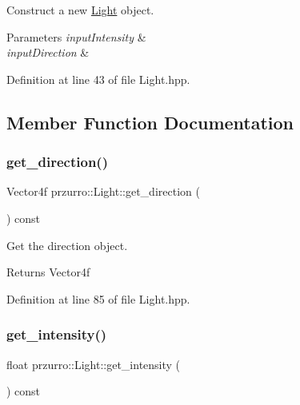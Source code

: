 Construct a new \mbox{\hyperlink{classprzurro_1_1_light}{Light}} object. 


\begin{DoxyParams}{Parameters}
{\em input\+Intensity} & \\
\hline
{\em input\+Direction} & \\
\hline
\end{DoxyParams}


Definition at line 43 of file Light.\+hpp.



\subsection{Member Function Documentation}
\mbox{\label{classprzurro_1_1_light_a0fd4b65685aea10cff7e7523c42cc573}} 
\subsubsection{\texorpdfstring{get\_direction()}{get\_direction()}}
{\footnotesize\ttfamily Vector4f przurro\+::\+Light\+::get\+\_\+direction (\begin{DoxyParamCaption}{ }\end{DoxyParamCaption}) const\hspace{0.3cm}{\ttfamily [inline]}}



Get the direction object. 

\begin{DoxyReturn}{Returns}
Vector4f 
\end{DoxyReturn}


Definition at line 85 of file Light.\+hpp.

\mbox{\label{classprzurro_1_1_light_a2e044cf45455887892b46ff1263e4a45}} 
\subsubsection{\texorpdfstring{get\_intensity()}{get\_intensity()}}
{\footnotesize\ttfamily float przurro\+::\+Light\+::get\+\_\+intensity (\begin{DoxyParamCaption}{ }\end{DoxyParamCaption}) const\hspace{0.3cm}{\ttfamily [inline]}}



